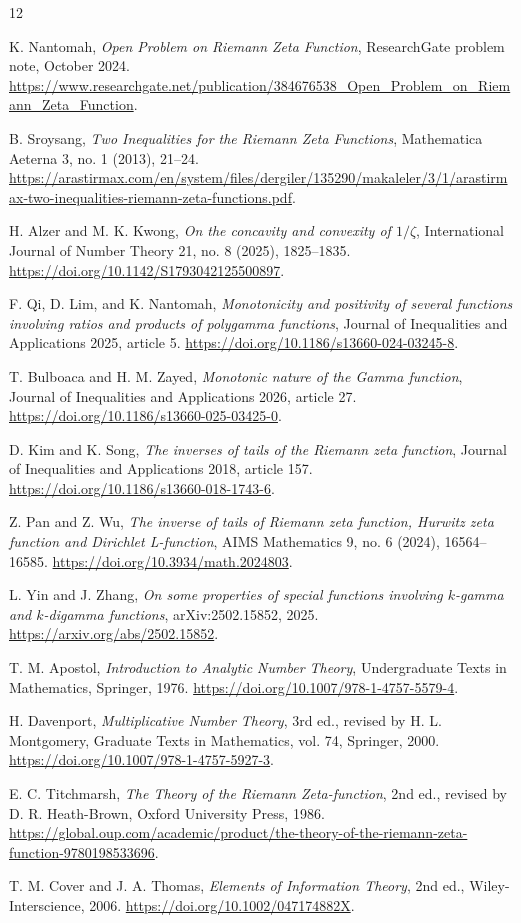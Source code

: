 \documentclass[11pt]{article}
\numberwithin{equation}{section}
\theoremstyle{definition}
\theoremstyle{remark}
\newcommand{\1}{\mathbf 1}
\begin{document}
\begin{thebibliography}{12}

K. Nantomah,
\emph{Open Problem on Riemann Zeta Function},
ResearchGate problem note, October 2024.
\url{https://www.researchgate.net/publication/384676538_Open_Problem_on_Riemann_Zeta_Function}.

B. Sroysang,
\emph{Two Inequalities for the Riemann Zeta Functions},
Mathematica Aeterna 3, no. 1 (2013), 21--24.
\url{https://arastirmax.com/en/system/files/dergiler/135290/makaleler/3/1/arastirmax-two-inequalities-riemann-zeta-functions.pdf}.

H. Alzer and M. K. Kwong,
\emph{On the concavity and convexity of \(1/\zeta\)},
International Journal of Number Theory 21, no. 8 (2025), 1825--1835.
\url{https://doi.org/10.1142/S1793042125500897}.

F. Qi, D. Lim, and K. Nantomah,
\emph{Monotonicity and positivity of several functions involving ratios and products of polygamma functions},
Journal of Inequalities and Applications 2025, article 5.
\url{https://doi.org/10.1186/s13660-024-03245-8}.

T. Bulboaca and H. M. Zayed,
\emph{Monotonic nature of the Gamma function},
Journal of Inequalities and Applications 2026, article 27.
\url{https://doi.org/10.1186/s13660-025-03425-0}.

D. Kim and K. Song,
\emph{The inverses of tails of the Riemann zeta function},
Journal of Inequalities and Applications 2018, article 157.
\url{https://doi.org/10.1186/s13660-018-1743-6}.

Z. Pan and Z. Wu,
\emph{The inverse of tails of Riemann zeta function, Hurwitz zeta function and Dirichlet L-function},
AIMS Mathematics 9, no. 6 (2024), 16564--16585.
\url{https://doi.org/10.3934/math.2024803}.


L. Yin and J. Zhang,
\emph{On some properties of special functions involving \(k\)-gamma and \(k\)-digamma functions},
arXiv:2502.15852, 2025.
\url{https://arxiv.org/abs/2502.15852}.

T. M. Apostol,
\emph{Introduction to Analytic Number Theory},
Undergraduate Texts in Mathematics, Springer, 1976.
\url{https://doi.org/10.1007/978-1-4757-5579-4}.

H. Davenport,
\emph{Multiplicative Number Theory},
3rd ed., revised by H. L. Montgomery, Graduate Texts in Mathematics, vol. 74, Springer, 2000.
\url{https://doi.org/10.1007/978-1-4757-5927-3}.

E. C. Titchmarsh,
\emph{The Theory of the Riemann Zeta-function},
2nd ed., revised by D. R. Heath-Brown, Oxford University Press, 1986.
\url{https://global.oup.com/academic/product/the-theory-of-the-riemann-zeta-function-9780198533696}.

T. M. Cover and J. A. Thomas,
\emph{Elements of Information Theory},
2nd ed., Wiley-Interscience, 2006.
\url{https://doi.org/10.1002/047174882X}.

\end{thebibliography}
\end{document}
